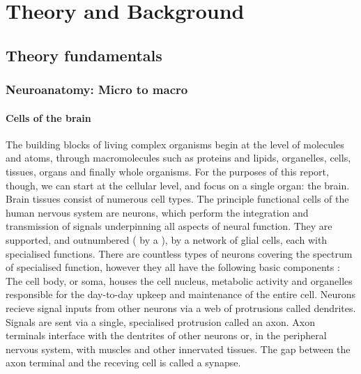 \chapter{Theory and Background}
\label{chapterlabel1}

\section{Theory fundamentals}
\label{theory}


\subsection{Neuroanatomy: Micro to macro}

\subsubsection{Cells of the brain}


The building blocks of living complex organisms begin at the level of molecules and atoms, through macromolecules such as proteins and lipids, organelles, cells, tissues, organs and finally whole organisms.
For the purposes of this report, though, we can start at the cellular level, and focus on a single organ: the brain.
Brain tissues consist of numerous cell types.
The principle functional cells of the human nervous system are neurons, which perform the integration and transmission of signals underpinning all aspects of neural function.
They are supported, and outnumbered ( by a ), by a network of glial cells, each with specialised functions.
There are countless types of neurons covering the spectrum of specialised function, however they all have the following basic components :
The cell body, or soma, houses the cell nucleus, metabolic activity and organelles responsible for the day-to-day upkeep and maintenance of the entire cell.
Neurons recieve signal inputs from other neurons via a web of protrusions called dendrites. 
Signals are sent via a single, specialised protrusion called an axon.
Axon terminals interface with the dentrites of other neurons or, in the peripheral nervous system, with muscles and other innervated tissues.
The  gap between the axon terminal and the receving cell is called a synapse.

